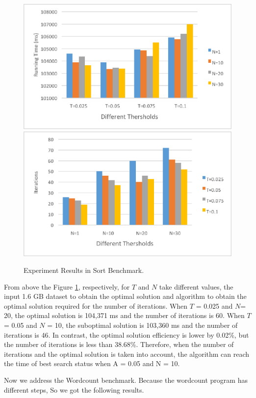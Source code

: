 \begin{figure}[!htbp]
	\centering
	{\includegraphics[width=0.49\linewidth]{SortRunningTime.eps}}
	{\includegraphics[width=0.49\linewidth]{SortIterations.eps}}\\
	\centering
	\caption{Experiment Results in Sort Benchmark.}
	\vspace{-3mm}
	\label{fig:sortcompare}
\end{figure}
\par From above the Figure \ref{fig:sortcompare}, respectively, for $T$ and $N$ take different values, the input 1.6 GB dataset to obtain the optimal solution and algorithm to obtain the optimal solution required for the number of iterations. When $T$ = 0.025 and $N$= 20, the optimal solution is 104,371 ms and the number of iterations is 60. When $T$ = 0.05 and $N$ = 10, the suboptimal solution is 103,360 ms and the number of iterations is 46. In contrast, the optimal solution efficiency is lower by 0.02\%, but the number of iterations is less than 38.68\%. Therefore, when the number of iterations and the optimal solution is taken into account, the algorithm can reach the time of best search status when A = 0.05 and N = 10. 
\par Now we address the Wordcount benchmark. Because the wordcount program has different steps, So we got the following results.
